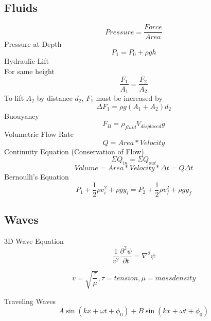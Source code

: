 \documentclass{article}
\begin{document}
{\subsection{Fluids}
\begin{equation}Pressure = \frac{Force}{Area}\end{equation}
Pressure at Depth
\begin{equation}P_{1} = P_{0} + \rho gh\end{equation}
Hydraulic Lift\\For same height\begin{equation} \frac{F_{1}}{A_{1}} = \frac{F_{2}}{A_{2}} \end{equation}
To lift $A_{2}$ by distance $d_{2}$, $F_{1}$ must be increased by
 \begin{equation} \Delta F_{1} = \rho g(A_{1} + A_{2})d_{2}\end{equation}
 Buouyancy
 \begin{equation}F_{B} = \rho_{fluid}V_{displaced}g\end{equation}
 Volumetric Flow Rate
  \begin{equation}Q = Area*Velocity\end{equation}
  Continuity Equation (Conservation of Flow)
  \begin{equation}\Sigma Q_{in} = \Sigma Q_{out} \end{equation}
  \begin{equation}Volume = Area*Velocity*\Delta t = Q\Delta t\end{equation}
Bernoulli's Equation
 \begin{equation}P_{1} + \frac{1}{2}\rho v_{i}^2 + \rho gy_{i} =P_{2} + \frac{1}{2}\rho v_{f}^2 + \rho gy_{f}\end{equation}

\subsection{Waves}
3D Wave Equation\begin{equation}\frac{1}{v^2} \frac{\partial^2\psi}{\partial t}= \nabla^2 \psi \end{equation}

\begin{equation}v=\sqrt{\frac{\tau}{\mu}},  \tau=tension, \mu=mass density \end{equation}

Traveling Waves\begin{equation}A\sin(kx+\omega t + \phi_0)+B\sin(kx+\omega t +\phi_0)\end{equation}

}
\end{document}

